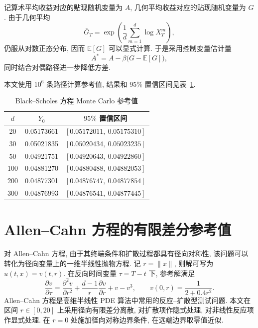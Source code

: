     记算术平均收益对应的贴现随机变量为 $A$,
    几何平均收益对应的贴现随机变量为 $G$.
    由于几何平均
    \begin{equation}
      \bar{G}_T = \exp\!\left(\frac{1}{d}\sum_{m=1}^{d}\log X_T^{m}\right),
      \label{eq:bsgbar}
    \end{equation}
    仍服从对数正态分布, 因而 $\mathbb{E}[G]$ 可以显式计算.
    于是采用控制变量估计量
    \begin{equation}
      A^{\ast}=A-\beta\bigl(G-\mathbb{E}[G]\bigr),
      \label{eq:bsdsigma}
    \end{equation}
    同时结合对偶路径进一步降低方差.

    本文使用 $10^6$ 条路径计算参考值, 结果和 $95\%$ 置信区间见表~\ref{tab:ref_bsm}.

    \begin{table}
      \centering
      \caption{Black--Scholes 方程 Monte Carlo 参考值}
      \label{tab:ref_bsm}
      \begin{tabular}{ccc}
        \toprule
        $d$ & $Y_0$ & $95\%$ 置信区间 \\
        \midrule
        20 & 0.05173661 & $[0.05172011,\ 0.05175310]$ \\
        30 & 0.05021835 & $[0.05020434,\ 0.05023235]$ \\
        50 & 0.04921751 & $[0.04920643,\ 0.04922860]$ \\
        100 & 0.04881270 & $[0.04880488,\ 0.04882053]$ \\
        200 & 0.04877301 & $[0.04876747,\ 0.04877854]$ \\
        300 & 0.04876993 & $[0.04876541,\ 0.04877445]$ \\
        \bottomrule
      \end{tabular}
    \end{table}

  \section{Allen--Cahn 方程的有限差分参考值}\label{sec:ref_allencahn}
    对 Allen--Cahn 方程, 由于其终端条件和扩散过程都具有径向对称性,
    该问题可以转化为径向变量上的一维半线性抛物方程.
    记 $r=\lVert x\rVert$, 则解可写为 $u(t,x)=v(t,r)$.
    在反向时间变量 $\tau=T-t$ 下, 参考解满足
    \begin{equation}
      \frac{\partial v}{\partial \tau}
      =
      \frac{\partial^2 v}{\partial r^2}
      + \frac{d-1}{r}\frac{\partial v}{\partial r}
      + v - v^3,
      \qquad
      v(0,r)=\frac{1}{2+0.4r^2}.
      \label{eq:acv}
    \end{equation}
    Allen--Cahn 方程是高维半线性 PDE 算法中常用的反应--扩散型测试问题\cite{hanSolvingHighdimensionalPartial2018}.
    本文在区间 $r\in[0,20]$ 上采用径向有限差分离散,
    对扩散项作隐式处理, 对非线性反应项作显式处理.
    在 $r=0$ 处施加径向对称边界条件, 在远端边界取零值近似.

